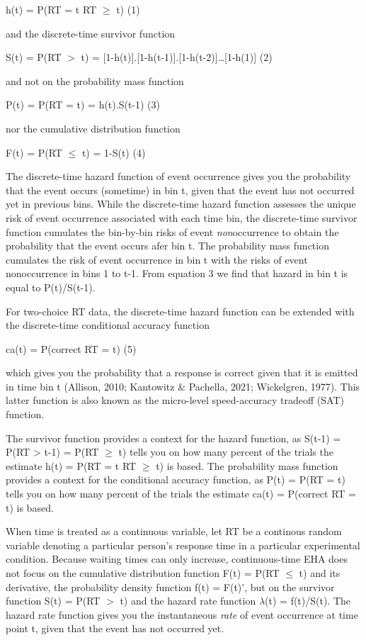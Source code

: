\documentclass[
  man,floatsintext]{apa6}
\begin{document}
\noindent h(t) = P(RT = t\textbar{} RT \(\geq\) t) \hfill  (1)

\noindent and the discrete-time survivor function

\noindent S(t) = P(RT \(>\) t) = {[}1-h(t){]}.{[}1-h(t-1){]}.{[}1-h(t-2){]}\ldots{[}1-h(1){]} \hfill  (2)

\noindent and not on the probability mass function

\noindent P(t) = P(RT = t) = h(t).S(t-1) \hfill  (3)

\noindent nor the cumulative distribution function

\noindent F(t) = P(RT \(\leq\) t) = 1-S(t) \hfill  (4)

The discrete-time hazard function of event occurrence gives you the probability that the event occurs (sometime) in bin t, given that the event has not occurred yet in previous bins. While the discrete-time hazard function assesses the unique risk of event occurrence associated with each time bin, the discrete-time survivor function cumulates the bin-by-bin risks of event \emph{non}occurrence to obtain the probability that the event occurs afer bin t. The probability mass function cumulates the risk of event occurrence in bin t with the risks of event nonoccurrence in bins 1 to t-1. From equation 3 we find that hazard in bin t is equal to P(t)/S(t-1).

For two-choice RT data, the discrete-time hazard function can be extended with the discrete-time conditional accuracy function

\noindent ca(t) = P(correct \textbar{} RT = t) \hfill  (5)

\noindent which gives you the probability that a response is correct given that it is emitted in time bin t (Allison, 2010; Kantowitz \& Pachella, 2021; Wickelgren, 1977). This latter function is also known as the micro-level speed-accuracy tradeoff (SAT) function.

The survivor function provides a context for the hazard function, as S(t-1) = P(RT \textgreater{} t-1) = P(RT \(\geq\) t) tells you on how many percent of the trials the estimate h(t) = P(RT = t\textbar{} RT \(\geq\) t) is based. The probability mass function provides a context for the conditional accuracy function, as P(t) = P(RT = t) tells you on how many percent of the trials the estimate ca(t) = P(correct \textbar{} RT = t) is based.

When time is treated as a continuous variable, let RT be a continous random variable denoting a particular person's response time in a particular experimental condition. Because waiting times can only increase, continuous-time EHA does not focus on the cumulative distribution function F(t) = P(RT \(\leq\) t) and its derivative, the probability density function f(t) = F(t)', but on the survivor function S(t) = P(RT \(>\) t) and the hazard rate function \(\lambda\)(t) = f(t)/S(t). The hazard rate function gives you the instantaneous \emph{rate} of event occurrence at time point t, given that the event has not occurred yet.
\end{document}
